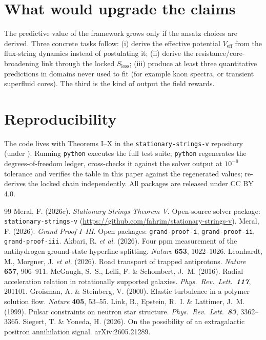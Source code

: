 \documentclass[12pt,a4paper]{article}
\begin{document}
\section{What would upgrade the claims}
The predictive value of the framework grows only if the ansatz choices are
derived. Three concrete tasks follow: (i) derive the effective potential
$V_{\mathrm{eff}}$ from the flux-string dynamics instead of postulating
it; (ii) derive the resistance/core-broadening link through the locked
$S_{\mathrm{loss}}$; (iii) produce at least three quantitative predictions
in domains never used to fit (for example kaon spectra, or transient
superfluid cores). The third is the kind of output the field rewards.

\section{Reproducibility}
The code lives with Theorems I--X in the \texttt{stationary-strings-v}
repository (under ). Running \texttt{python}
 executes the full test suite; \texttt{python}
 regenerates the degrees-of-freedom ledger, cross-checks it
against the solver output at $10^{-9}$ tolerance and verifies the table
in this paper against the regenerated values; 
re-derives the locked chain independently. All packages are released under
CC BY 4.0.

\begin{thebibliography}{99}
     Meral, F. (2026c). \textit{Stationary Strings
    Theorem V}. Open-source solver package: \texttt{stationary-strings-v}
    (\url{https://github.com/fahrim/stationary-strings-v}).
     Meral, F. (2026). \textit{Grand Proof I--III}.
    Open packages: \texttt{grand-proof-i}, \texttt{grand-proof-ii},
    \texttt{grand-proof-iii}.
     Akbari, R. \textit{et al.} (2026). Four ppm measurement of
    the antihydrogen ground-state hyperfine splitting. \textit{Nature}
    \textbf{653}, 1022--1026.
     Leonhardt, M., Morgner, J. \textit{et al.} (2026). Road
    transport of trapped antiprotons. \textit{Nature} \textbf{657}, 906--911.
     McGaugh, S.~S., Lelli, F. \& Schombert, J.~M. (2016).
    Radial acceleration relation in rotationally supported galaxies.
    \textit{Phys.\ Rev.\ Lett.\ \textbf{117}}, 201101.
     Groisman, A. \& Steinberg, V. (2000). Elastic turbulence in
    a polymer solution flow. \textit{Nature} \textbf{405}, 53--55.
     Link, B., Epstein, R.~I. \& Lattimer, J.~M. (1999).
    Pulsar constraints on neutron star structure.
    \textit{Phys.\ Rev.\ Lett.\ \textbf{83}}, 3362--3365.
     Siegert, T. \& Yoneda, H. (2026). On the possibility of an
    extragalactic positron annihilation signal. arXiv:2605.21289.
\end{thebibliography}
\end{document}
